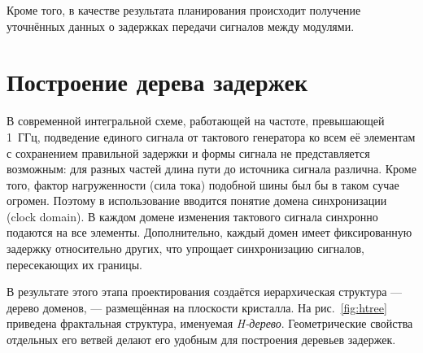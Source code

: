 Кроме того, в качестве результата планирования происходит получение уточнённых данных о задержках передачи сигналов между модулями. 



% 

\section{Построение дерева задержек}

В современной интегральной схеме, работающей на частоте, превышающей 1~ГГц, подведение единого сигнала от тактового генератора ко всем её элементам с сохранением правильной задержки и формы сигнала не представляется возможным: для разных частей длина пути до источника сигнала различна. Кроме того, фактор нагруженности (сила тока) подобной шины был бы в таком сучае огромен. Поэтому в использование вводится понятие домена синхронизации (\abbr clock domain). В каждом домене изменения тактового сигнала синхронно подаются на все элементы. Дополнительно, каждый домен имеет фиксированную задержку относительно других, что упрощает синхронизацию сигналов, пересекающих их границы.

В результате этого этапа проектирования создаётся иерархическая структура — дерево доменов, — размещённая на плоскости кристалла. На рис.~\ref{fig:htree} приведена фрактальная структура, именуемая \textit{H-дерево}. Геометрические свойства отдельных его ветвей делают его удобным для построения деревьев задержек.

